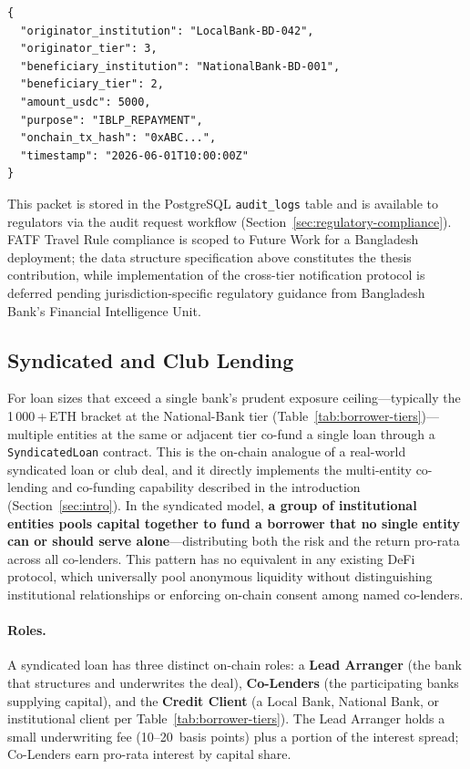 \documentclass[12pt,a4paper]{report}
\begin{document}
\begin{verbatim}
{
  "originator_institution": "LocalBank-BD-042",
  "originator_tier": 3,
  "beneficiary_institution": "NationalBank-BD-001",
  "beneficiary_tier": 2,
  "amount_usdc": 5000,
  "purpose": "IBLP_REPAYMENT",
  "onchain_tx_hash": "0xABC...",
  "timestamp": "2026-06-01T10:00:00Z"
}
\end{verbatim}

This packet is stored in the PostgreSQL \texttt{audit\_logs} table and is available to regulators via the audit request workflow (Section~\ref{sec:regulatory-compliance}). FATF Travel Rule compliance is scoped to Future Work for a Bangladesh deployment; the data structure specification above constitutes the thesis contribution, while implementation of the cross-tier notification protocol is deferred pending jurisdiction-specific regulatory guidance from Bangladesh Bank's Financial Intelligence Unit.

\subsection{Syndicated and Club Lending}
\label{sec:syndicated-lending}

For loan sizes that exceed a single bank's prudent exposure ceiling---typically the 1\,000\,+\,ETH bracket at the National-Bank tier (Table~\ref{tab:borrower-tiers})---multiple entities at the same or adjacent tier co-fund a single loan through a \texttt{SyndicatedLoan} contract. This is the on-chain analogue of a real-world syndicated loan or club deal, and it directly implements the multi-entity co-lending and co-funding capability described in the introduction (Section~\ref{sec:intro}). In the syndicated model, \textbf{a group of institutional entities pools capital together to fund a borrower that no single entity can or should serve alone}---distributing both the risk and the return pro-rata across all co-lenders. This pattern has no equivalent in any existing DeFi protocol, which universally pool anonymous liquidity without distinguishing institutional relationships or enforcing on-chain consent among named co-lenders.

\paragraph{Roles.}
A syndicated loan has three distinct on-chain roles: a \textbf{Lead Arranger} (the bank that structures and underwrites the deal), \textbf{Co-Lenders} (the participating banks supplying capital), and the \textbf{Credit Client} (a Local Bank, National Bank, or institutional client per Table~\ref{tab:borrower-tiers}). The Lead Arranger holds a small underwriting fee (10--20~basis points) plus a portion of the interest spread; Co-Lenders earn pro-rata interest by capital share.
\end{document}
